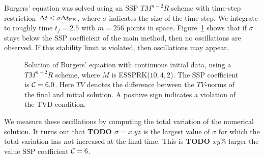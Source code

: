 Burgers' equation was solved using an SSP $TM^{n-2}R$ scheme with time-step
restriction $\Delta t \leq \sigma{\Delta t}_{\text{FE}}$, where $\sigma$ indicates the size 
of the time step. 
We integrate to roughly time $t_{f} = 2.5$
with $m = 256$ points in space.
Figure~\ref{fig:burgers_cont} shows that if $\sigma$ stays below the SSP 
coefficient of the main method, then no oscillations are observed. 
If this stability limit is violated, then oscillations may appear.
\begin{figure}
    \centering
    \quad
    \caption{Solution of Burgers' equation with continuous initial data, using a 
    $TM^{n-2}R$ scheme, where $ M $ is ESSPRK($10,4,2$). 
    The SSP coefficient is $\mathcal{C} = 6.0$. 
    Here $TV$ denotes the difference between the $TV$-norms of the final and 
    initial solution.
    A positive sign indicates a violation of the TVD condition.}
    \label{fig:burgers_cont}
\end{figure}
We measure these oscillations by computing the total variation of the 
numerical solution.
It turns out that \textbf{\red TODO $\sigma = x.yz$}
is the largest value of $\sigma$ for which the total variation has not
increased at the final time.
This is \textbf{\red TODO $xy\%$} larger the value SSP coefficient
$\mathcal{C} = 6$.

